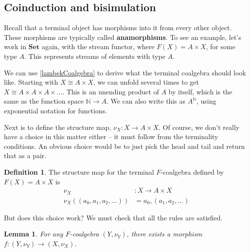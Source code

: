 \documentclass{article}
\theoremstyle{plain}
\newtheorem{lemma}{Lemma}
\theoremstyle{definition}
\newtheorem{definition}{Definition}
\begin{document}
\subsection{Coinduction and bisimulation}


Recall that a terminal object has morphisms into it from every other object. These morphisms are typically called \textbf{anamorphisms}. To see an example, let's work in \ensuremath{\mathbf{Set}} again, with the stream functor, where \ensuremath{F\left( X \right) = A \times X}, for some type \ensuremath{A}. This represents streams of elements with type \ensuremath{A}.

We can use \ref{lambekCoalgebra} to derive what the terminal coalgebra should look like. Starting with \ensuremath{X \cong A \times X}, we can unfold several times to get \ensuremath{X \cong A \times A \times A \times \ldots}. This is an unending product of \ensuremath{A} by itself, which is the same as the function space \ensuremath{\mathbb{N} \rightarrow A}. We can also write this as \ensuremath{{A}^{\mathbb{N} }}, using exponential notation for functions.

Next is to define the structure map, \ensuremath{{\nu }_{X} : X \rightarrow A \times X}. Of course, we don't really have a choice in this matter either -- it must follow from the terminality conditions. An obvious choice would be to just pick the head and tail and return that as a pair.

\begin{definition}
The structure map for the terminal \ensuremath{F}-coalgebra defined by \ensuremath{F\left( X \right) = A \times X} is \[
\begin{aligned}
{\nu }_{X} & : X \rightarrow A \times X \\ {\nu }_{X} \left( \left( {a}_{0}, {a}_{1}, {a}_{2}, \ldots \right) \right) & = {a}_{0}, \left( {a}_{1}, {a}_{2}, \ldots \right)
\end{aligned}
\]
\end{definition}
\label{reassociateHeadTail} 

But does this choice work? We must check that all the rules are satisfied.

\begin{lemma}
 For any \ensuremath{F}-coalgebra \ensuremath{\left( Y, {\nu }_{Y} \right)}, there exists a morphism \ensuremath{f : \left( Y, {\nu }_{Y} \right) \rightarrow \left( X, {\nu }_{X} \right)}. 
\end{lemma}
\label{fExists} 
\end{document}

